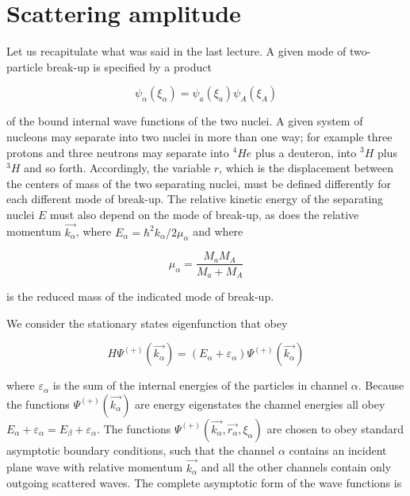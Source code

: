 \documentclass[a4paper,14pt]{book}
\begin{document}
 \setcounter{chapter}{2}
\chapter{Scattering amplitude}
Let us recapitulate what was said in the last lecture. A given mode of two-particle break-up is specified by a product

\begin{equation}
\psi_{\alpha}(\xi_{\alpha}) = \psi_a (\xi_a) \psi_A (\xi_A)
\end{equation}

\noindent of the bound internal wave functions of the two nuclei. A given system of nucleons may separate into two nuclei in more than one way; for example three protons and three neutrons may separate into $^4 He$  plus a deuteron, into $^3 H$ plus $^3 H$ and so forth. Accordingly, the variable $r$, which is the displacement between the centers of mass of the two separating nuclei, must be defined differently for each different mode of break-up. The relative kinetic energy of the separating nuclei $E$ must also depend on the mode of break-up, as does the relative momentum $\vec{k_{\alpha}}$, where $E_{\alpha}=\hbar^2 k_{\alpha}/2\mu_{\alpha}$ and where

\begin{equation}
\mu_{\alpha} = \frac{M_a M_A}{M_a+M_A}
\end{equation}

\noindent is the reduced mass of the indicated mode of break-up.

We consider the stationary states eigenfunction that obey

\begin{equation}
H \Psi^{(+)}(\vec{k_{\alpha}}) = (E_{\alpha}+\varepsilon_{\alpha}) \Psi^{(+)} (\vec{k_{\alpha}})
\end{equation}

\noindent where $\varepsilon_{\alpha}$ is the sum of the internal energies of the particles in channel $\alpha$. Because the functions $\Psi^{(+)}(\vec{k_{\alpha}})$ are energy eigenstates the channel energies all obey $E_{\alpha}+\varepsilon_{\alpha}=E_{\beta}+\varepsilon_{\alpha}$. The functions $\Psi^{(+)}(\vec{k_{\alpha}},\vec{r_{\alpha}}, \xi_{\alpha})$ are chosen to obey standard asymptotic boundary conditions, such that the channel $\alpha$ contains an incident plane wave with relative momentum $\vec{k_{\alpha}}$ and all the other channels contain only outgoing scattered waves. The complete asymptotic form of the wave functions is
\end{document}
